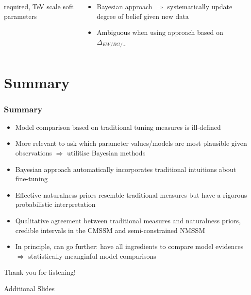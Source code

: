 \documentclass[10pt,aspectratio=169]{beamer}
\begin{document}
\begin{frame}
\begin{columns}[t]
\begin{column}{0.5\textwidth}
\begin{itemize}
        required, TeV scale soft parameters
      \end{itemize}
    \end{column}
    \begin{column}{0.5\textwidth}
      \begin{itemize} \itemsep0.7em
      \item {\color{blue} Bayesian approach $\Rightarrow$
        systematically update degree of belief given new data}
      \item \alert{Ambiguous when using approach based on
        $\Delta_{EW/BG/\ldots}$}
      \end{itemize}
    \end{column}
  \end{columns}
\end{frame}

\section{Summary}

\begin{frame}
  \frametitle{Summary}
  \begin{itemize} \itemsep1em
  \item Model comparison based on traditional tuning measures is
    ill-defined
  \item More relevant to ask which parameter values/models are
    most plausible given observations $\Rightarrow$ utilitise Bayesian
    methods
  \item Bayesian approach automatically incorporates traditional
    intuitions about fine-tuning
  \item {\color{blue} Effective naturalness priors resemble traditional
    measures but have a rigorous probabilistic interpretation}
  \item Qualitative agreement between traditional measures and naturalness
    priors, credible intervals in the CMSSM and semi-constrained NMSSM
  \item In principle, can go further: have all ingredients to
    compare model evidences $\Rightarrow$ {\color{blue} statistically
      meanginful model comparisons}
  \end{itemize}
  \begin{center}
    \large Thank you for listening!
  \end{center}
\end{frame}

\appendix

\begin{frame}
  \begin{center}
    {
      \Large
      Additional Slides
    }
  \end{center}
\end{frame}
\end{document}
